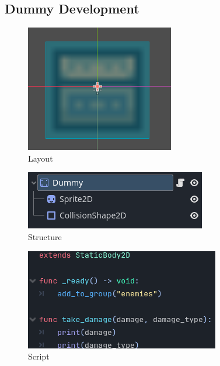 \documentclass{article}
\begin{document}
        \subsection{Dummy Development}
        \begin{multicols}{3}
                \begin{figure}[H]
                        \centering
                        \includegraphics[width = 0.9\columnwidth]{images/development/Dummy_layout.PNG}
                        \caption{Layout}
                \end{figure}
                \begin{figure}[H]
                        \centering
                        \includegraphics[width = 0.9\columnwidth]{images/development/Dummy_structure.PNG}
                        \caption{Structure}
                \end{figure}
                \begin{figure}[H]
                        \centering
                        \includegraphics[width = 0.9\columnwidth]{images/development/Dummy_script.PNG}
                        \caption{Script}
                \end{figure}
        \end{multicols}
\end{document}
